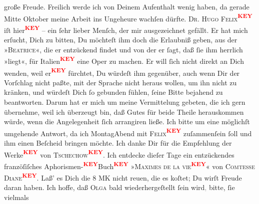 \begin{ledgroupsized}[t]{13cm}
                    große Freude. Freilich werde ich von Deinem Aufenthalt wenig haben, {\pb} da gerade Mitte Oktober meine
                    Arbeit ins Ungeheure wachſen dürfte. \pend
           \pstart
           \textsc{Dr. Hugo Felix\textcolor{red}{\textsuperscript{\textbf{KEY}}}} iſt hier\textcolor{red}{\textsuperscript{\textbf{KEY}}} – ein ſehr lieber Menſch, der mir
                    ausgezeichnet gefällt. Er hat mich 
                    erſucht, Dich zu bitten, Du möchteſt ihm doch die Erlaubniß geben, aus der »\textsc{Beatrice}«, die er entzückend findet und von der er ſagt, daß ſie ihm herrlich
                    »liegt«, für Italien\textcolor{red}{\textsuperscript{\textbf{KEY}}} eine Oper zu machen. Er will
                    ſich nicht direkt an {\pb} Dich wenden, weil er\textcolor{red}{\textsuperscript{\textbf{KEY}}} fürchtet, Du würdeſt ihm gegenüber, auch wenn
                    Dir der Vorſchlag nicht paßte, mit der Sprache nicht heraus wollen, um ihn nicht
                        \strikeout{\textcolor{gray}{kra}} zu kränken, und würdeſt Dich ſo gebunden fühlen, ſeine Bitte bejahend zu
                    beantworten. Darum hat er mich um meine Vermittelung gebeten, die ich gern
                    übernehme, weil ich überzeugt bin, daß Gutes für beide Theile herauskommen
                    würde, wenn die Angelegenheit {\pb} ſich arrangiren
                    ließe. Ich bitte um eine möglichſt umgehende Antwort, da ich MontagAbend mit \textsc{Felix\textcolor{red}{\textsuperscript{\textbf{KEY}}}} zuſammenſein ſoll und ihm einen Beſcheid bringen möchte. \pend
           \pstart
           Ich danke Dir für die Empfehlung der Werke\textcolor{red}{\textsuperscript{\textbf{KEY}}} von \textsc{Tschechow\textcolor{red}{\textsuperscript{\textbf{KEY}}}}. Ich entdecke dieſer Tage ein entzückendes franzöſiſches Aphorismen-\textcolor{red}{\textsuperscript{\textbf{KEY}}}{\pb}Buch\textcolor{red}{\textsuperscript{\textbf{KEY}}} »\textsc{Maximes de la vie\textcolor{red}{\textsuperscript{\textbf{KEY}}}}« von \textsc{Comtesse Diane\textcolor{red}{\textsuperscript{\textbf{KEY}}}}. Laß’ es Dich die 8 \textsc{MK} nicht reuen, die es
                    koſtet; Du wirſt Freude daran haben. \pend
           \pstart
           Ich hoffe, daß \textsc{Olga} bald wiederhergeſtellt ſein wird\textcolor{gray}{,} bitte, ſie vielmals

\end{ledgroupsized}
